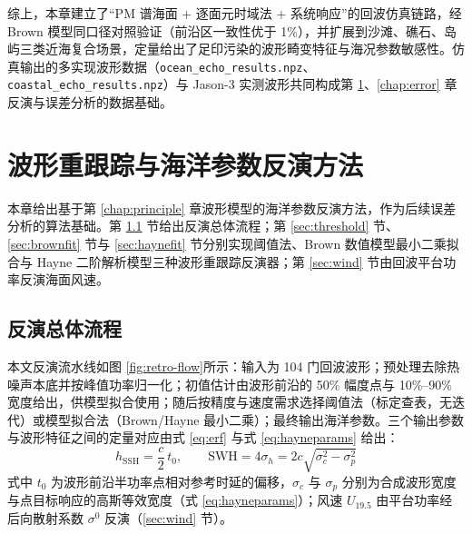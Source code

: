 \documentclass[a4paper]{article}
\newcommand{\sectionbreak}{\clearpage} %
\newcommand{\reffig}[1]{图 \ref{#1}}
\begin{document}
综上，本章建立了“PM 谱海面 + 逐面元时域法 + 系统响应”的回波仿真链路，经 Brown 模型同口径对照验证（前沿区一致性优于 1\%），并扩展到沙滩、礁石、岛屿三类近海复合场景，定量给出了足印污染的波形畸变特征与海况参数敏感性。仿真输出的多实现波形数据（\texttt{ocean\_echo\_results.npz}、\texttt{coastal\_echo\_results.npz}）与 Jason-3 实测波形共同构成第 \ref{chap:retracking}、\ref{chap:error} 章反演与误差分析的数据基础。

\sectionbreak

\section{波形重跟踪与海洋参数反演方法}
\label{chap:retracking}

本章给出基于第 \ref{chap:principle} 章波形模型的海洋参数反演方法，作为后续误差分析的算法基础。第 \ref{sec:retro-flow} 节给出反演总体流程；第 \ref{sec:threshold} 节、\ref{sec:brownfit} 节与 \ref{sec:haynefit} 节分别实现阈值法、Brown 数值模型最小二乘拟合与 Hayne 二阶解析模型三种波形重跟踪反演器；第 \ref{sec:wind} 节由回波平台功率反演海面风速。

\subsection{反演总体流程}
\label{sec:retro-flow}

本文反演流水线如\reffig{fig:retro-flow}所示：输入为 104 门回波波形；预处理去除热噪声本底并按峰值功率归一化；初值估计由波形前沿的 50\% 幅度点与 10\%--90\% 宽度给出，供模型拟合使用；随后按精度与速度需求选择阈值法（标定查表，无迭代）或模型拟合法（Brown/Hayne 最小二乘）；最终输出海洋参数。三个输出参数与波形特征之间的定量对应由式 \eqref{eq:erf} 与式 \eqref{eq:hayneparams} 给出：
\begin{equation}
	h_{\mathrm{SSH}} = \frac{c}{2}\, t_0, \qquad \mathrm{SWH} = 4 \sigma_h = 2c \sqrt{\sigma_c^{2} - \sigma_p^{2}}
	\label{eq:param-map}
\end{equation}
式中 $t_0$ 为波形前沿半功率点相对参考时延的偏移，$\sigma_c$ 与 $\sigma_p$ 分别为合成波形宽度与点目标响应的高斯等效宽度（式 \eqref{eq:hayneparams}）；风速 $U_{19.5}$ 由平台功率经后向散射系数 $\sigma^0$ 反演（\ref{sec:wind} 节）。
\end{document}
